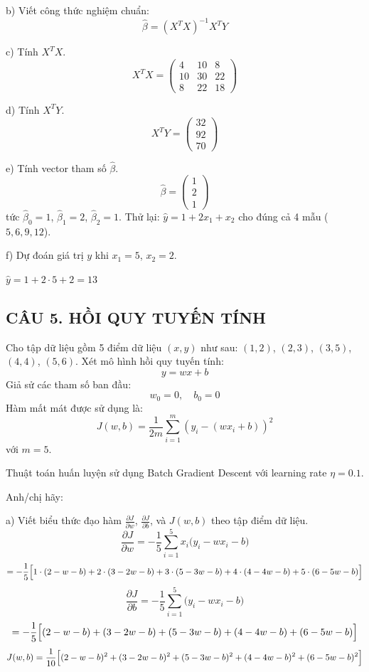 \documentclass[a4paper,12pt]{article}
\begin{document}
b) Viết công thức nghiệm chuẩn:
\[ \hat{\beta} = (X^T X)^{-1} X^T Y \]

c) Tính $X^T X$.
\[ X^T X = \begin{pmatrix}
4 & 10 & 8 \\
10 & 30 & 22 \\
8 & 22 & 18
\end{pmatrix} \]

d) Tính $X^T Y$.
\[ X^T Y = \begin{pmatrix} 32 \\ 92 \\ 70 \end{pmatrix} \]

e) Tính vector tham số $\hat{\beta}$.
\[ \hat{\beta} = \begin{pmatrix} 1 \\ 2 \\ 1 \end{pmatrix} \]
tức $\hat{\beta}_0 = 1$, $\hat{\beta}_1 = 2$, $\hat{\beta}_2 = 1$.
Thử lại: $\hat{y} = 1 + 2x_1 + x_2$ cho đúng cả 4 mẫu
($5, 6, 9, 12$).

f) Dự đoán giá trị $y$ khi $x_1 = 5$, $x_2 = 2$.

$\hat{y} = 1 + 2 \cdot 5 + 2 = 13$

\subsection*{CÂU 5. HỒI QUY TUYẾN TÍNH}

Cho tập dữ liệu gồm 5 điểm dữ liệu $(x, y)$ như sau: $(1,2)$, $(2,3)$, $(3,5)$,
$(4,4)$, $(5,6)$. Xét mô hình hồi quy tuyến tính:
\[ y = wx + b \]
Giả sử các tham số ban đầu:
\[ w_0 = 0, \quad b_0 = 0 \]
Hàm mất mát được sử dụng là:
\[ J(w,b) = \frac{1}{2m}\sum_{i=1}^{m}\left( y_i - \left( wx_i + b \right) \right)^{2} \]
với $m = 5$.

Thuật toán huấn luyện sử dụng Batch Gradient Descent với learning rate $\eta = 0.1$.

Anh/chị hãy:

a) Viết biểu thức đạo hàm $\frac{\partial J}{\partial w}$,
$\frac{\partial J}{\partial b}$, và $J(w,b)$ theo tập điểm dữ liệu.
\[ \frac{\partial J}{\partial w} = -\frac{1}{5}\sum_{i=1}^{5}x_i\bigl(y_i - wx_i - b\bigr) \]
\[ = -\frac{1}{5}\Bigl[1\cdot(2 - w - b) + 2\cdot(3 - 2w - b) + 3\cdot(5 - 3w - b) + 4\cdot(4 - 4w - b) + 5\cdot(6 - 5w - b)\Bigr] \]
\[ \frac{\partial J}{\partial b} = -\frac{1}{5}\sum_{i=1}^{5}\bigl(y_i - wx_i - b\bigr) \]
\[ = -\frac{1}{5}\Bigl[(2 - w - b) + (3 - 2w - b) + (5 - 3w - b) + (4 - 4w - b) + (6 - 5w - b)\Bigr] \]
\[ J(w,b) = \frac{1}{10}\Bigl[(2 - w - b)^2 + (3 - 2w - b)^2 + (5 - 3w - b)^2 + (4 - 4w - b)^2 + (6 - 5w - b)^2\Bigr] \]
\end{document}
